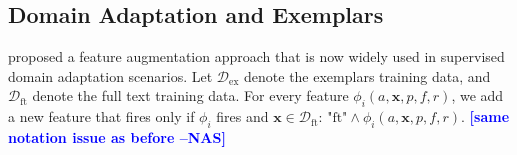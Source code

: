 \documentclass[11pt,a4paper]{article}
\newcommand{\indicator}[1]{I_{\{#1\}}} %
\newcommand{\exemplars}{\mathrm{ex}}
\newcommand{\fulltext}{\mathrm{ft}}
\newcommand{\ensuretext}[1]{#1}
\newcommand{\nssmarker}{\ensuretext{\textcolor{magenta}{\ensuremath{^{\textsc{NS}}_{\textsc{S}}}}}}
\newcommand{\stmarker}{\ensuretext{\textcolor{blue}{\ensuremath{^{\textsc{S}}_{\textsc{T}}}}}}
\newcommand{\arkcomment}[3]{\ensuretext{\textcolor{#3}{[#1 #2]}}}
\newcommand{\nss}[1]{\arkcomment{\nssmarker}{#1}{magenta}}
\newcommand{\st}[1]{\arkcomment{\stmarker}{#1}{blue}}
\newcommand{\x}{\mathbf{x}}
\newcommand{\nascomment}[1]{\textcolor{blue}{\textbf{\small [#1 --NAS]}}}
\newcommand{\finalversion}[1]{}
\begin{document}
\subsection{Domain Adaptation and Exemplars}
\label{sec:frust}
 proposed a feature augmentation approach that is now
widely used in supervised domain adaptation scenarios.
Let $\mathcal{D}_{\exemplars}$ denote the exemplars training data, and
$\mathcal{D}_{\fulltext}$ denote the full text training data.
For every feature $\phi_i(a, \mathbf{x}, p, f, r)$, we add a new
feature that fires only if $\phi_i$ fires and $\x \in \mathcal{D}_{\fulltext}$:
$\text{"ft"} \wedge \phi_i(a, \mathbf{x}, p, f,
r)$.\finalversion{\nss{why the $i$ subscript? is that for the training
    instance as above?}} \nascomment{same notation issue as before}

\end{document}
